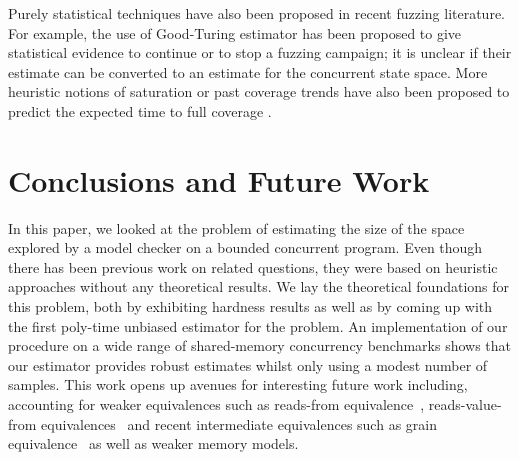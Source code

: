 Purely statistical techniques have also been proposed in recent  fuzzing literature.
For example, the use of Good-Turing estimator \cite{10.1145/3210309, 10.1145/3611019,10.1145/3468264.3468570} has been proposed to give statistical evidence to continue or to stop a fuzzing campaign; it is unclear if their estimate can
be converted to an estimate for the concurrent state space.
More heuristic notions of saturation or past coverage trends have also been proposed to predict the expected time to full coverage  \cite{10.1145/3597503.3639198,10.1145/3597926.3598043}. 
%





\section{Conclusions and Future Work}

In this paper, we looked at the problem of estimating the size of the space explored by a model checker on a bounded concurrent program. Even though there has been previous work on related questions, they were based on heuristic approaches without any theoretical results. 
We lay the theoretical foundations for this problem, both by exhibiting hardness results as well as by coming up with the first poly-time unbiased estimator for the problem. 
An implementation of our procedure on a wide range of shared-memory concurrency benchmarks shows that our estimator provides robust estimates whilst only using a modest number of samples.
This work  opens up avenues for interesting future work including, accounting 
for weaker equivalences such as reads-from equivalence~\cite{readsFrom2019},
reads-value-from equivalences~\cite{readsValue2021} and recent intermediate
equivalences such as grain equivalence~\cite{FarzanMathur2024} as well as weaker memory models.

 
